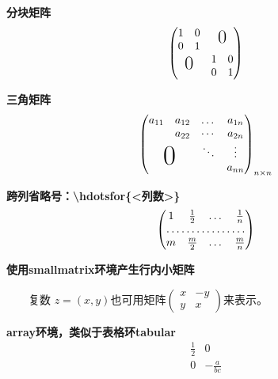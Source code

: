 \documentclass{ctexart}
\begin{document}
   \textbf{分块矩阵}
   \[
   \begin{pmatrix}
       \begin{matrix}1&0\\0&1\end{matrix} & \text{\LARGE 0}\\
        \text{\LARGE 0} & \begin{matrix}1&0\\0&1\end{matrix}
   \end{pmatrix}
   \]

   \textbf{三角矩阵}
   \[
   \begin{pmatrix}
    a_{11} & a_{12} & \dots & a_{1n}\\
    & a_{22} &\cdots & a_{2n}\\
    &        & \ddots & \vdots \\
    \multicolumn{2}{c}{\raisebox{1.3ex}[0pt]{\Huge 0}}
    & & a_{nn}
   \end{pmatrix}_{n\times n}
   \]

   \textbf{跨列省略号：\textbackslash hdotsfor\{<列数>\}}
   \[
   \begin{pmatrix}
    1 & \frac12 & \dots & \frac1n \\
    \hdotsfor{4} \\
    m & \frac m2 & \dots & \frac mn
   \end{pmatrix}
   \]

   \textbf{使用smallmatrix环境产生行内小矩阵}

   \ \ \ \ 复数 $z=(x,y)$也可用矩阵\begin{math}
      \left(
          \begin{smallmatrix}
              x & -y\\
              y & x
          \end{smallmatrix}
      \right) 
   \end{math}来表示。

   \textbf{array环境，类似于表格环tabular}
   \[
   \begin{array}{r|r}
       \frac12 & 0 \\
       \hline 
       0 & -\frac{a}{bc}
   \end{array}
   \]
\end{document}
